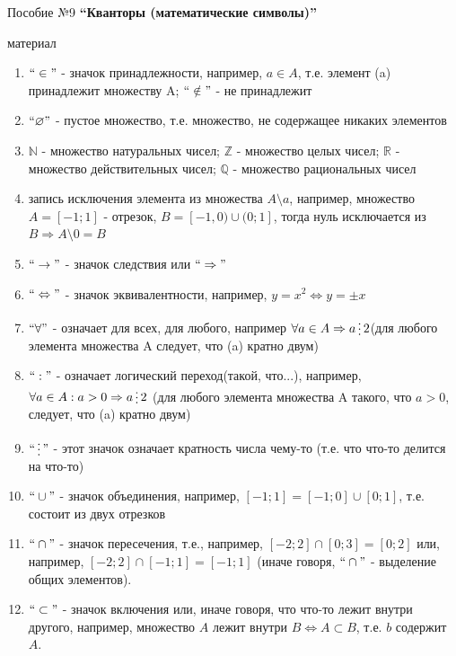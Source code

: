 \documentclass[a4paper,12pt]{article} %
\date{}
\author{}
\newcommand{\divisible}{\mathop{\raisebox{-2pt}{\vdots}}}
\begin{document}
\begin{flushleft}
{Пособие №9}
\hfill
{\bf ``Кванторы (математические символы)''}
\end{flushleft}				

\begin{center}
{ материал}
\end{center}

\newcommand{\hm}[1]{#1\nobreak\discretionary{}{\hbox{\ensuremath{#1}}}{}}
\begin{enumerate}
\item $``\in"$ - значок принадлежности, например, $a \in A$, т.е. элемент (a) принадлежит множеству A; $``\notin "$ - не принадлежит
\item $``\varnothing "$ - пустое множество, т.е. множество, не содержащее никаких элементов
\item $\mathbb N$ - множество натуральных чисел; $\mathbb Z$ - множество целых чисел; $\mathbb R$ - множество действительных чисел; $\mathbb Q$ - множество рациональных чисел
\item запись исключения элемента из множества $A\setminus {a}$, например, множество $A=[-1;1]$ - отрезок, $B = [-1,0)\cup (0;1]$, тогда нуль исключается из $B \Rightarrow A \setminus {0} = B$
\item $``\rightarrow "$ - значок следствия или $``\Rightarrow "$
\item $``\Leftrightarrow "$ - значок эквивалентности, например, $y = x^2 \Leftrightarrow y = \pm x$
\item $``\forall "$ - означает для всех, для любого, например $\forall a \in A \Rightarrow a \divisible 2$(для любого элемента множества A следует, что (a) кратно двум)
\item $``: "$ - означает логический переход(такой, что...), например, $\forall a \in A : a > 0 \Rightarrow a \divisible 2$
(для любого элемента множества A такого, что $a > 0$, следует, что (a) кратно двум)
\item $``\divisible "$ - этот значок означает кратность числа чему-то (т.е. что что-то делится на что-то)
\item $``\cup "$ - значок объединения, например, $[-1;1] = [-1;0]\cup [0;1]$, т.е. состоит из  двух отрезков
\item $``\cap "$ - значок пересечения, т.е., например, $[-2;2]\cap [0;3] = [0;2]$ или, например, $[-2;2] \cap [-1;1] = [-1;1]$ (иначе говоря, $``\cap "$ - выделение общих элементов).
\item $``\subset "$ - значок включения или, иначе говоря, что что-то лежит внутри другого, например, множество $A$ лежит внутри $B \Leftrightarrow A \subset B$, т.е. $b$ содержит $A$.

\end{enumerate}
\end{document}
